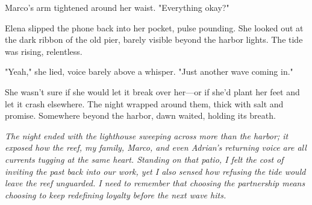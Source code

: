 Marco's arm tightened around her waist. "Everything okay?"

Elena slipped the phone back into her pocket, pulse pounding. She looked out at the dark ribbon of the old pier, barely visible beyond the harbor lights. The tide was rising, relentless.

"Yeah," she lied, voice barely above a whisper. "Just another wave coming in."

She wasn't sure if she would let it break over her—or if she'd plant her feet and let it crash elsewhere. The night wrapped around them, thick with salt and promise. Somewhere beyond the harbor, dawn waited, holding its breath.

\noindent\textit{The night ended with the lighthouse sweeping across more than the harbor; it exposed how the reef, my family, Marco, and even Adrian's returning voice are all currents tugging at the same heart. Standing on that patio, I felt the cost of inviting the past back into our work, yet I also sensed how refusing the tide would leave the reef unguarded. I need to remember that choosing the partnership means choosing to keep redefining loyalty before the next wave hits.}

